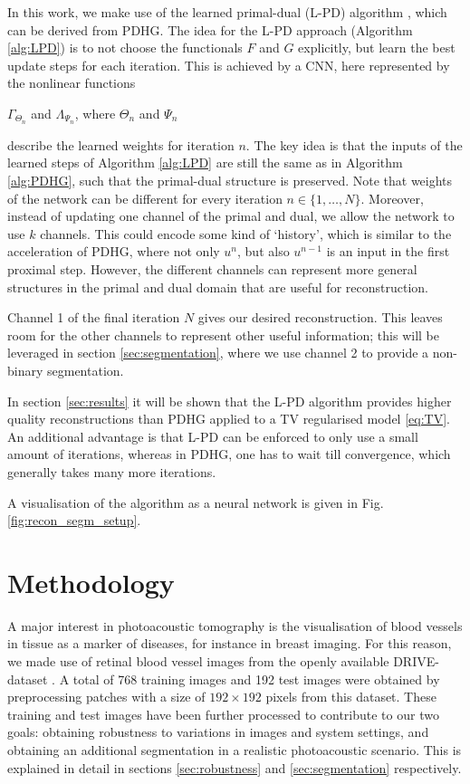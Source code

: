 \documentclass[journal]{IEEEtran}
\newcommand{\hl}[1]{\cbcolor{red}\begin{changebar}{\color{red} #1}\end{changebar}}
\begin{document}
In this work, we make use of the learned primal-dual (L-PD) algorithm \cite{Adler2018}, which can be derived from PDHG. The idea for the L-PD approach (Algorithm \ref{alg:LPD}) is to not choose the functionals $F$ and $G$ explicitly, but learn the best update steps for each iteration. This is achieved by a CNN, here represented by the nonlinear functions \hl{$\Gamma_{\Theta_n}$ and $\Lambda_{\Psi_n}$, where $\Theta_n$ and $\Psi_n$} describe the learned weights for iteration $n$. The key idea is that the inputs of the learned steps of Algorithm \ref{alg:LPD} are still the same as in Algorithm \ref{alg:PDHG}, such that the primal-dual structure is preserved. Note that weights of the network can be different for every iteration $n\in\{1,\dots,N\}$. Moreover, instead of updating one channel of the primal and dual, we allow the network to use $k$ channels. This could encode some kind of `history', which is similar to the acceleration of PDHG, where not only $u^n$, but also $u^{n-1}$ is an input in the first proximal step. However, the different channels can represent more general structures in the primal and dual domain that are useful for reconstruction. \hl{Channel 1 of the final iteration $N$ gives our desired reconstruction. This leaves room for the other channels to represent other useful information; this will be leveraged in section \ref{sec:segmentation}, where we use channel 2 to provide a non-binary segmentation.} In section \ref{sec:results} it will be shown that the L-PD algorithm provides higher quality reconstructions than PDHG applied to a TV regularised model \eqref{eq:TV}. An additional advantage is that L-PD can be enforced to only use a small amount of iterations, whereas in PDHG, one has to wait till convergence, which generally takes many more iterations. \hl{A visualisation of the algorithm as a neural network is given in Fig. \ref{fig:recon_segm_setup}.}

\section{Methodology}\label{sec:experiments}
A major interest in photoacoustic tomography is the visualisation of blood vessels in tissue as a marker of diseases, for instance in breast imaging. For this reason, we made use of retinal blood vessel images from the openly available DRIVE-dataset \cite{Staal2004}. A total of 768 training images and 192 test images were obtained by preprocessing patches with a size of $192\times192$ pixels from this dataset. These training and test images have been further processed to contribute to our two goals: obtaining robustness to variations in images and system settings, and obtaining an additional segmentation in a realistic photoacoustic scenario. This is explained in detail in sections \ref{sec:robustness} and \ref{sec:segmentation} respectively.
\end{document}

